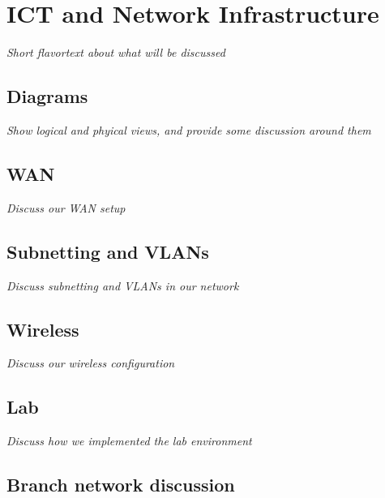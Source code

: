 \section{ICT and Network Infrastructure}

%

\textit{Short flavortext about what will be discussed}


\subsection{Diagrams}

\textit{Show logical and phyical views, and provide some discussion around them}

\subsection{WAN}

\textit{Discuss our WAN setup}

\subsection{Subnetting and VLANs}

\textit{Discuss subnetting and VLANs in our network}

\subsection{Wireless}

\textit{Discuss our wireless configuration}

\subsection{Lab}

\textit{Discuss how we implemented the lab environment}

\subsection{Branch network discussion}

